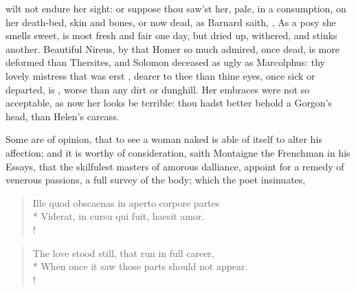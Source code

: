 wilt not endure her sight: or suppose thou saw'st her, pale, in a
consumption, on her death-bed, skin and bones, or now dead,  as Barnard saith, , As a posy she smells sweet, is most
fresh and fair one day, but dried up, withered, and stinks another. Beautiful
Nireus, by that Homer so much admired, once dead, is more deformed than
Thersites, and Solomon deceased as ugly as Marcolphus: thy lovely mistress that
was erst , dearer to thee than
thine eyes, once sick or departed, is , worse
than any dirt or dunghill. Her embraces were not so acceptable, as now her
looks be terrible: thou hadst better behold a Gorgon's head, than Helen's
carcass.

Some are of opinion, that to see a woman naked is able of itself to
alter his affection; and it is worthy of consideration, saith
Montaigne the Frenchman in his Essays, that the skilfulest
masters of amorous dalliance, appoint for a remedy of venerous
passions, a full survey of the body; which the poet insinuates,
\begin{latin}%
\begin{verse}%
Ille quod obscaenas in aperto corpore partes\\*
Viderat, in cursu qui fuit, haesit amor.\\!
\end{verse}%
\end{latin}%
\translationrule%
\begin{verse}%
The love stood still, that run in full career,\\*
When once it saw those parts should not appear.\\!
\end{verse}%
%

